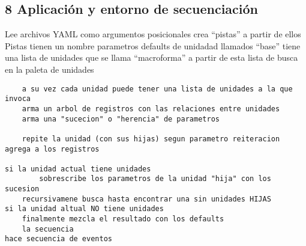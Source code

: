 \documentclass[]{article}
\begin{document}
\hypertarget{aplicaciuxf3n-y-entorno-de-secuenciaciuxf3n}{%
\subsection{8 Aplicación y entorno de
secuenciación}\label{aplicaciuxf3n-y-entorno-de-secuenciaciuxf3n}}

Lee archivos YAML como argumentos posicionales crea ``pistas'' a partir
de ellos Pistas tienen un nombre parametros defaults de unidadad
llamados ``base'' tiene una lista de unidades que se llama
``macroforma'' a partir de esta lista de busca en la paleta de unidades

\begin{Verbatim}
    a su vez cada unidad puede tener una lista de unidades a la que invoca
    arma un arbol de registros con las relaciones entre unidades
    arma una "sucecion" o "herencia" de parametros

    repite la unidad (con sus hijas) segun parametro reiteracion
agrega a los registros

si la unidad actual tiene unidades
        sobrescribe los parametros de la unidad "hija" con los sucesion
    recursivamene busca hasta encontrar una sin unidades HIJAS
si la unidad altual NO tiene unidades
    finalmente mezcla el resultado con los defaults 
    la secuencia
hace secuencia de eventos
\end{Verbatim}
\end{document}

